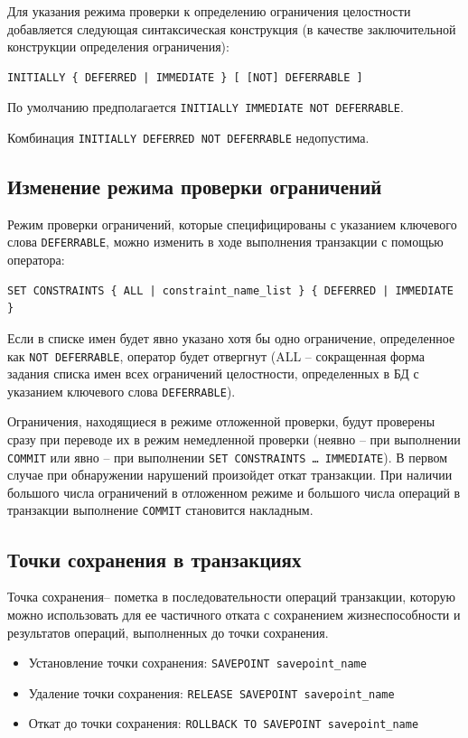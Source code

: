 \documentclass[a4paper,12pt]{article}
\begin{document}
Для указания режима проверки к определению ограничения целостности добавляется следующая синтаксическая конструкция (в качестве заключительной конструкции определения ограничения):
\begin{verbatim}
INITIALLY { DEFERRED | IMMEDIATE } [ [NOT] DEFERRABLE ]
\end{verbatim}
По умолчанию предполагается \texttt{INITIALLY IMMEDIATE NOT DEFERRABLE}.

Комбинация \texttt{INITIALLY DEFERRED NOT DEFERRABLE} недопустима.

\subsection{Изменение режима проверки ограничений}

Режим проверки ограничений, которые специфицированы с указанием ключевого слова \texttt{DEFERRABLE}, можно изменить в ходе выполнения транзакции с помощью оператора:
\begin{verbatim}
SET CONSTRAINTS { ALL | constraint_name_list } { DEFERRED | IMMEDIATE }
\end{verbatim}
Если в списке имен будет явно указано хотя бы одно ограничение, определенное как \texttt{NOT DEFERRABLE}, оператор будет отвергнут (ALL – сокращенная форма задания списка имен всех ограничений целостности, определенных в БД с указанием ключевого слова \texttt{DEFERRABLE}).

Ограничения, находящиеся в режиме отложенной проверки, будут проверены сразу при переводе их в режим немедленной проверки (неявно – при выполнении \texttt{COMMIT} или явно – при выполнении \texttt{SET CONSTRAINTS … IMMEDIATE}). В первом случае при обнаружении нарушений произойдет откат транзакции. При наличии большого числа ограничений в отложенном режиме и большого числа операций в транзакции выполнение \texttt{COMMIT} становится накладным.

\subsection{Точки сохранения в транзакциях}

Точка сохранения– пометка в последовательности операций транзакции, которую можно использовать для ее частичного отката с сохранением жизнеспособности и результатов операций, выполненных до точки сохранения.

\begin{itemize}
    \item Установление точки сохранения: \texttt{SAVEPOINT savepoint\_name}
    \item Удаление точки сохранения: \texttt{RELEASE SAVEPOINT savepoint\_name}
    \item Откат до точки сохранения: \texttt{ROLLBACK TO SAVEPOINT savepoint\_name}
\end{itemize}
\end{document}
